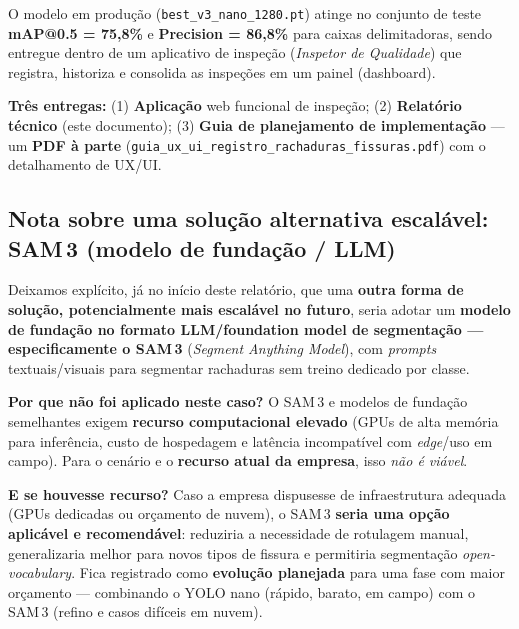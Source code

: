 \documentclass[11pt,a4paper]{article}
\begin{document}
O modelo em produção (\texttt{best\_v3\_nano\_1280.pt}) atinge no conjunto de teste
\textbf{mAP@0.5 = 75,8\%} e \textbf{Precision = 86,8\%} para caixas delimitadoras, sendo
entregue dentro de um aplicativo de inspeção (\emph{Inspetor de Qualidade}) que registra,
historiza e consolida as inspeções em um painel (dashboard).

\begin{infobox}
\textbf{Três entregas:} (1) \textbf{Aplicação} web funcional de inspeção;
(2) \textbf{Relatório técnico} (este documento);
(3) \textbf{Guia de planejamento de implementação} — um \textbf{PDF à parte}
(\texttt{guia\_ux\_ui\_registro\_rachaduras\_fissuras.pdf}) com o detalhamento de UX/UI.
\end{infobox}

\subsection{Nota sobre uma solução alternativa escalável: SAM\,3 (modelo de fundação / LLM)}
Deixamos explícito, já no início deste relatório, que uma \textbf{outra forma de solução,
potencialmente mais escalável no futuro}, seria adotar um \textbf{modelo de fundação no
formato LLM/foundation model de segmentação — especificamente o SAM\,3}
(\emph{Segment Anything Model}), com \emph{prompts} textuais/visuais para segmentar
rachaduras sem treino dedicado por classe.

\begin{notebox}
\textbf{Por que não foi aplicado neste caso?} O SAM\,3 e modelos de fundação semelhantes
exigem \textbf{recurso computacional elevado} (GPUs de alta memória para inferência, custo de
hospedagem e latência incompatível com \emph{edge}/uso em campo). Para o cenário e o
\textbf{recurso atual da empresa}, isso \emph{não é viável}.

\textbf{E se houvesse recurso?} Caso a empresa dispusesse de infraestrutura adequada
(GPUs dedicadas ou orçamento de nuvem), o SAM\,3 \textbf{seria uma opção aplicável e
recomendável}: reduziria a necessidade de rotulagem manual, generalizaria melhor para novos
tipos de fissura e permitiria segmentação \emph{open-vocabulary}. Fica registrado como
\textbf{evolução planejada} para uma fase com maior orçamento — combinando o YOLO nano
(rápido, barato, em campo) com o SAM\,3 (refino e casos difíceis em nuvem).
\end{notebox}
\end{document}
